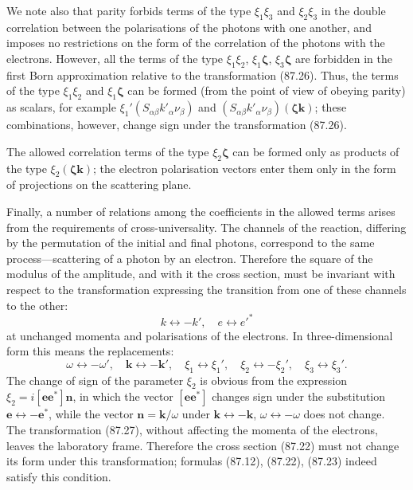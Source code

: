 We note also that parity forbids terms of the type $\xi_1\xi_3$ and $\xi_2\xi_3$ in the double correlation between the polarisations of the photons with one another, and imposes no restrictions on the form of the correlation of the photons with the electrons. However, all the terms of the type $\xi_1\xi_2$, $\xi_1\boldsymbol{\zeta}$, $\xi_3\boldsymbol{\zeta}$ are forbidden in the first Born approximation relative to the transformation (87.26). Thus, the terms of the type $\xi_1\xi_2$ and $\xi_1\boldsymbol{\zeta}$ can be formed (from the point of view of obeying parity) as scalars, for example $\xi_1'(S_{\alpha\beta}k'_\alpha \nu_\beta)$ and $(S_{\alpha\beta}k'_\alpha\nu_\beta)(\boldsymbol{\zeta}\mathbf{k})$; these combinations, however, change sign under the transformation (87.26).

The allowed correlation terms of the type $\xi_2\boldsymbol{\zeta}$ can be formed only as products of the type $\xi_2(\boldsymbol{\zeta}\mathbf{k})$; the electron polarisation vectors enter them only in the form of projections on the scattering plane.

Finally, a number of relations among the coefficients in the allowed terms arises from the requirements of cross-universality. The channels of the reaction, differing by the permutation of the initial and final photons, correspond to the same process---scattering of a photon by an electron. Therefore the square of the modulus of the amplitude, and with it the cross section, must be invariant with respect to the transformation expressing the transition from one of these channels to the other:
\begin{equation}
k \leftrightarrow -k', \quad e \leftrightarrow e'^*
\label{eq:87.27}
\end{equation}
at unchanged momenta and polarisations of the electrons. In three-dimensional form this means the replacements:
\[
\omega \leftrightarrow -\omega', \quad \mathbf{k} \leftrightarrow -\mathbf{k}', \quad \xi_1 \leftrightarrow \xi_1', \quad \xi_2 \leftrightarrow -\xi_2', \quad \xi_3 \leftrightarrow \xi_3'.
\]
The change of sign of the parameter $\xi_2$ is obvious from the expression $\xi_2 = i[\mathbf{ee}^*]\mathbf{n}$, in which the vector $[\mathbf{ee}^*]$ changes sign under the substitution $\mathbf{e} \leftrightarrow -\mathbf{e}^*$, while the vector $\mathbf{n} = \mathbf{k}/\omega$ under $\mathbf{k} \leftrightarrow -\mathbf{k}$, $\omega \leftrightarrow -\omega$ does not change. The transformation (87.27), without affecting the momenta of the electrons, leaves the laboratory frame. Therefore the cross section (87.22) must not change its form under this transformation; formulas (87.12), (87.22), (87.23) indeed satisfy this condition.
